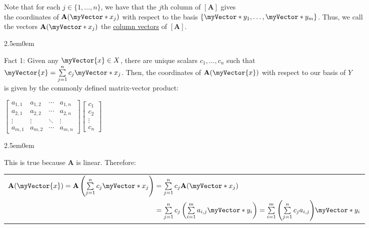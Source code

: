 \documentclass{book}
\newcommand{\hTwo}{%
   \color{MidnightBlue}%
   \fontsize{13}{15}\selectfont%
}
\newcommand{\hThree}{%
   \color{PineGreen!85!Orange}
   \fontsize{13}{15}\selectfont%
}
\newenvironment{myIndent}{%
   \begin{adjustwidth}{2.5em}{0em}%
}{%
   \end{adjustwidth}%
}
\newcommand{\udefine}[1]{{%
   \setulcolor{Red}%
   \setul{0.14em}{0.07em}%
   \ul{#1}%
}}
\newcommand{\uuline}[2][.]{%
{\vphantom{a}\color{#1}%
\rlap{\rule[-0.18em]{\widthof{#2}}{0.06em}}%
\rlap{\rule[-0.32em]{\widthof{#2}}{0.06em}}}%
#2}
\newcommand{\retTwo}{\hfill\bigbreak}
\newcommand{\mVec}[1]{\myVector{#1}}
\newcommand{\mVecAst}[1]{\myVector*{#1}}
\newcommand{\mMat}[1]{\mathbf{#1}}
\begin{document}
Note that for each $j \in \{1,\ldots,n\}$, we have that the $j$th column of $[\mMat{A}]$ gives\\ the coordinates of $\mMat{A}(\mVecAst{x}_j)$ with respect to the basis $\{\mVecAst{y}_1, \ldots, \mVecAst{y}_m\}$. Thus, we call\\ the vectors $\mMat{A}(\mVecAst{x}_j)$ the \udefine{column vectors} of $[\mMat{A}]$.\\ [-6pt]

{\begin{myIndent}\hTwo
   \uuline{Fact 1}: Given any $\mVec{x} \in X$, there are unique scalars $c_1, \ldots, c_n$ such that\\ $\mVec{x} = \sum\limits_{j=1}^n c_j\mVecAst{x}_j$. Then, the coordinates of $\mMat{A}(\mVec{x})$ with respect to our basis of $Y$\\ is given by the commonly defined matrix-vector product:\\ [-6pt]

   {\center $\begin{bmatrix}
      a_{1,1} & a_{1,2} & \cdots & a_{1,n} \\
      a_{2,1} & a_{2,2} & \cdots & a_{2,n} \\
      \vdots & \vdots & \ddots & \vdots \\
      a_{m,1} & a_{m,2} & \cdots & a_{m,n}
   \end{bmatrix}
   \begin{bmatrix}
      c_1 \\ c_2 \\ \vdots \\ c_n
   \end{bmatrix}$\par}

   \newpage 

   {\begin{myIndent}\hThree
      This is true because $\mMat{A}$ is linear. Therefore:\\ [-6pt]

      {\centering\fontsize{12}{14}\selectfont 
      \begin{tabular}{l}
         $\mMat{A}(\mVec{x}) = \mMat{A}\left(\sum\limits_{j=1}^n c_j\mVecAst{x}_j\right) = \sum\limits_{j=1}^n c_j\mMat{A}(\mVecAst{x}_j)$ \\ [-5pt]
         $\phantom{\mMat{A}(\mVec{x}) = \mMat{A}\left(\sum\limits_{j=1}^n c_j\mVecAst{x}_j\right)} = \sum\limits_{j=1}^n c_j \left(\sum\limits_{i=1}^{m}a_{i,j}\mVecAst{y}_i\right) = \sum\limits_{i=1}^m\left(\sum\limits_{j=1}^n c_ja_{i,j}\right)\hspace{-0.2em}\mVecAst{y}_i$
      \end{tabular}\retTwo\par}
   \end{myIndent}}


\end{myIndent}}
\end{document}
